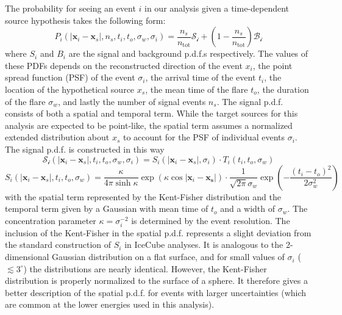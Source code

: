 \documentclass{gatech-thesis}
\begin{document}
The probability for seeing an event $i$ in our analysis given a time-dependent source hypothesis takes the following form:
\begin{equation}
P_i(|\mathbf{x}_i-\mathbf{x}_s|,n_s,t_i,t_o,\sigma_w,\sigma_i) = \frac{n_s}{n_{\mathrm{tot}}} \mathcal{S_i} + \left(1-\frac{n_s}{n_{\mathrm{tot}}}\right) \mathcal{B_i}
\end{equation}
where $S_i$ and $B_i$ are the signal and background p.d.f.s respectively. The values of these PDFs depends on the reconstructed direction of the event \textbf{$x_i$}, the point spread function (PSF) of the event $\sigma_i$, the arrival time of the event $t_i$, the location of the hypothetical source \textbf{$x_s$}, the mean time of the flare $t_o$, the duration of the flare $\sigma_w$, and lastly the number of signal events $n_s$. The signal p.d.f. consists of both a spatial and temporal term. While the target sources for this analysis are expected to be point-like, the spatial term assumes a normalized extended distribution about \textbf{$x_s$} to account for the PSF of individual events $\sigma_i$. The signal p.d.f. is constructed in this way
\begin{equation}
\mathcal{S_i}(|\mathbf{x}_i-\mathbf{x}_s|,t_i,t_o,\sigma_w,\sigma_i) = S_i(|\mathbf{x}_i-\mathbf{x}_s|,\sigma_i) \cdot T_i(t_i,t_o,\sigma_w)
\end{equation}
\begin{equation}
S_i(|\mathbf{x}_i-\mathbf{x}_s|,t_i,t_o,\sigma_w) = \frac{\kappa}{4\pi \sinh \kappa} \exp \left(\kappa \cos |\mathbf{x}_i-\mathbf{x_s}|\right) \cdot \frac{1}{\sqrt{2\pi}\sigma_w} \exp \left(-\frac{(t_i-t_o)^2}{2 \sigma_w^2}\right)
\end{equation}
with the spatial term represented by the Kent-Fisher distribution \cite{1982} and the temporal term given by a Gaussian with mean time of $t_o$ and a width of $\sigma_w$. The concentration parameter $\kappa = \sigma_{i}^{-2}$ is determined by the event resolution. The inclusion of the Kent-Fisher in the spatial p.d.f. represents a slight deviation from the standard construction of $S_i$ in IceCube analyses. It is analogous to the 2-dimensional Gaussian distribution on a flat surface, and for small values of $\sigma_{i}$ ($\lesssim 3^{\circ}$) the distributions are nearly identical. However, the Kent-Fisher distribution is properly normalized to the surface of a sphere. It therefore gives a better description of the spatial p.d.f. for events with larger uncertainties (which are common at the lower energies used in this analysis).
\end{document}
